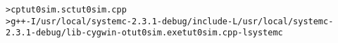 \begin{reviewcmd}
\begin{alltt}
\textgreater{} cp tut0\textunderscore{}sim.sc tut0\textunderscore{}sim.cpp
\textgreater{} g++ -I/usr/local/systemc-2.3.1-debug/include -L/usr/local/systemc-2.3.1-debug/lib-cygwin -o  tut0\textunderscore{}sim.exe tut0\textunderscore{}sim.cpp -lsystemc
\end{alltt}
\end{reviewcmd}

